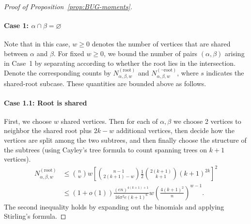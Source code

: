 \documentclass[11pt, letterpaper]{article}
\numberwithin{equation}{section}
\begin{document}
\begin{proof}[Proof of Proposition~\ref{prop:BUG-moments}]
\noindent \paragraph*{Case 1: $\alpha \cap \beta=\varnothing$}
Note that in this case, $w \ge 0$ denotes the number of vertices that are shared between $\alpha$ and $\beta$. For fixed $w \ge 0$, we bound the number of pairs $(\alpha,\beta)$ arising in Case~1 by separating according to whether the root lies in the intersection. Denote the corresponding counts by $N_{\alpha,\beta,w}^{(\mathrm{root})}$ and $N_{\alpha,\beta,w}^{(\lnot \mathrm{root})}$, where $s$ indicates the shared-root subcase. These quantities are bounded above as follows.
\noindent\paragraph*{Case 1.1: Root is shared} First, we choose $w$ shared vertices. Then for each of $\alpha,\beta$ we choose 2 vertices to neighbor the shared root plus $2k-w$ additional vertices, then decide how the vertices are split among the two subtrees, and then finally choose the structure of the subtrees (using Cayley's tree formula to count spanning trees on $k+1$ vertices). 
\begin{align*}
    N_{\alpha, \beta, w}^{(\mathrm{root})} & \leq \binom{n}{w}w\left[\binom{n-1}{2(k+1)-w}\frac{1}{2}\binom{2(k+1)}{k+1}(k+1)^{2k}\right]^2\\
&\leq(1+o(1))\frac{(en)^{4(k+1)+1}}{16\pi^2e(k+1)^6}w \left(\frac{4(k+1)^2}{n}\right)^{w-1} .
\end{align*}
The second inequality holds by expanding out the binomials and applying Stirling's formula.


\end{proof}
\end{document}
